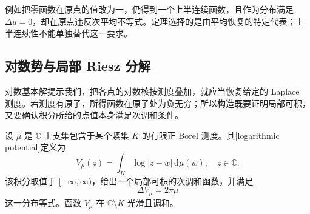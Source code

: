 例如把零函数在原点的值改为一，仍得到一个上半连续函数，且作为分布满足 \(\Delta u=0\)，却在原点违反次平均不等式。定理选择的是由平均恢复的特定代表；上半连续性不能单独替代这一要求。

\subsection{对数势与局部 Riesz 分解}
\label{b3:subsec:150404}

对数基本解提示我们，把各点的对数核按测度叠加，就应当恢复给定的 Laplace 测度。若测度有原子，所得函数在原子处为负无穷；所以构造既要证明局部可积，又要确认积分所给的点值本身满足次调和条件。

\begin{proposition}[紧支集测度的对数势]\label{b3:prop:15-log-potential}
设 \(\mu\) 是 \(\mathbb C\) 上支集包含于某个紧集 \(K\) 的有限正 Borel 测度。其[logarithmic potential]定义为
\[
 V_\mu(z)=\int_K\log|z-w|\,\mathrm{d}\mu(w),
 \quad z\in\mathbb C.
\]
该积分取值于 \([-\infty,\infty)\)，给出一个局部可积的次调和函数，并满足
\[
 \Delta V_\mu=2\pi\mu
\]
这一分布等式。函数 \(V_\mu\) 在 \(\mathbb C\setminus K\) 光滑且调和。
\end{proposition}
